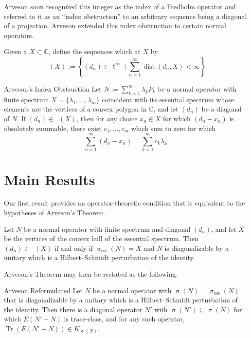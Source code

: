\documentclass{article}
\DeclareMathOperator{\dist}{dist}
\DeclareMathOperator{\Lim}{Lim^1}
\DeclareMathOperator{\trace}{Tr}
\DeclareMathOperator{\spec}{\sigma}
\newcommand{\essspec}{\spec_{\mathrm{ess}}}
\begin{document}
Arveson soon recognized this integer as the index of a Fredholm operator and referred to it as an ``index obstruction'' to an arbitrary sequence being a diagonal of a projection.
Arveson extended this index obstruction to certain normal operators.

\begin{definition}
  Given a $X \subset \mathbb{C}$, define the sequences which  at $X$ by
  \begin{equation*}
    \Lim (X) := \left\{ (d_n) \in \ell^{\infty} \mid \sum_{n=1}^{\infty} \dist(d_n,X) < \infty \right\}.
  \end{equation*}
\end{definition}

\begin{thmcustom}{Arveson's Index Obstruction}
  Let $N := \sum_{k=1}^m \lambda_k P_k$ be a normal operator with finite spectrum $X = \{\lambda_1,\ldots,\lambda_m\}$ coincident with its essential spectrum whose elements are the vertices of a convex polygon in $\mathbb{C}$, and let $(d_n)$ be a diagonal of $N$.
  If $(d_n) \in \Lim (X)$, then for any choice $x_n \in X$ for which $(d_n-x_n)$ is absolutely summable, there exist  $c_1,\ldots,c_m$ which sum to zero for which
  \begin{equation*}
    \sum_{n=1}^{\infty} (d_n-x_n) = \sum_{k=1}^m c_k \lambda_k.
  \end{equation*}
\end{thmcustom}

\framebreak

\section*{Main Results}

Our first result provides an operator-theoretic condition that is equivalent to the hypotheses of Arveson's Theorem.

\begin{theorem}
  Let $N$ be a normal operator with finite spectrum and diagonal $(d_n)$, and let $X$ be the vertices of the convex hull of the essential spectrum.
  Then $(d_n) \in \Lim(X)$ if and only if $\essspec(N) = X$ and $N$ is diagonalizable by a unitary which is a Hilbert--Schmidt perturbation of the identity.
\end{theorem}

Arveson's Theorem may then be restated as the following.

\begin{thmcustom}{Arveson Reformulated}
  Let $N$ be a normal operator with $\spec(N) = \essspec(N)$ that is diagonalizable by a unitary which is a Hilbert--Schmidt perturbation of the identity.
  Then there is a diagonal operator $N'$ with $\spec(N') \subseteq \spec(N)$ for which $E(N'-N)$ is trace-class, and for any such operator, $\trace(E(N'-N)) \in K_{\spec(N)}$.
\end{thmcustom}
\end{document}
